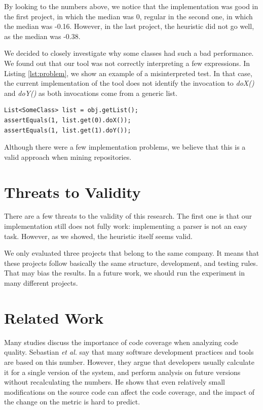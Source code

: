 \documentclass{sig-alternate}
\begin{document}
By looking to the numbers above, we notice that the implementation was good in the first project,
in which the median was 0, regular in the second one, in which the median was -0.16. However,
in the last project, the heuristic did not go well, as the median was -0.38.

We decided to closely investigate why some classes had such a bad performance. We found out
that our tool was not correctly interpreting a few expressions. In Listing \ref{lst:problem}, we
show an example of a misinterpreted test. In that case, the current implementation of the 
tool does not identify the invocation to \textit{doX()} and \textit{doY()} as both invocations
come from a generic list.

\begin{lstlisting}
List<SomeClass> list = obj.getList();
assertEquals(1, list.get(0).doX());
assertEquals(1, list.get(1).doY());
\end{lstlisting}

Although there were a few implementation problems, we believe that this is a valid approach
when mining repositories.


\section{Threats to Validity}
\label{sec-threats}

There are a few threats to the validity of this research. The first one is that our implementation
still does not fully work: implementing a parser is not an easy task. However, as we showed, the 
heuristic itself seems valid. 

We only evaluated three projects that belong to the same company. It means that these projects
follow basically the same structure, development, and testing rules. That may bias the results.
In a future work, we should run the experiment in many different projects.

\section{Related Work}
\label{sec-related-work}

Many studies discuss the importance of code coverage when analyzing code quality. 
Sebastian \textit{et al.} \cite{sebastian} say that many software development practices and tools
are based on this number. However, they argue that developers usually calculate it for a single
version of the system, and perform analysis on future versions without recalculating the numbers.
He shows that even relatively small modifications on the source code can affect the code coverage, 
and the impact of the change on the metric is hard to predict.
\end{document}
